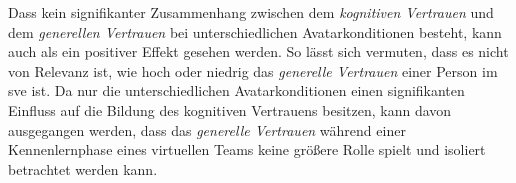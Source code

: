 \documentclass[a4paper,11pt]{article}%
\renewcommand{\\}{\vspace*{0.5\baselineskip} \newline}
\begin{document}
Dass kein signifikanter Zusammenhang zwischen dem \textit{kognitiven Vertrauen} und dem \textit{generellen Vertrauen} bei unterschiedlichen Avatarkonditionen besteht, kann auch als ein positiver Effekt gesehen werden.
So lässt sich vermuten, dass es nicht von Relevanz ist, wie hoch oder niedrig das \textit{generelle Vertrauen} einer Person im \ac{sve} ist. 
Da nur die unterschiedlichen Avatarkonditionen einen signifikanten Einfluss auf die Bildung des kognitiven Vertrauens besitzen, kann davon ausgegangen werden, dass das \textit{generelle Vertrauen} während einer Kennenlernphase eines virtuellen Teams keine größere Rolle spielt und isoliert betrachtet werden kann. 
%
%
\end{document}
